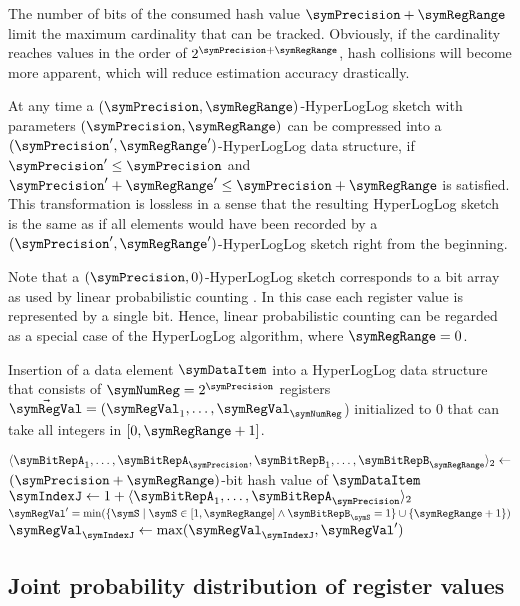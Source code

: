 \documentclass[a4paper]{scrartcl}
\begin{document}
The number of bits of the consumed hash value $\symPrecision+\symRegRange$ limit the maximum cardinality that can be tracked. Obviously, if the cardinality reaches values in the order of $2^{\symPrecision+\symRegRange}$, hash collisions will become more apparent, which will reduce estimation accuracy drastically.

At any time a $(\symPrecision, \symRegRange)$-HyperLogLog sketch with parameters $(\symPrecision, \symRegRange)$ can be compressed into a $(\symPrecision', \symRegRange')$-HyperLogLog data structure, if $\symPrecision'\leq\symPrecision$ and $\symPrecision'+\symRegRange' \leq\symPrecision + \symRegRange$ is satisfied. This transformation is lossless in a sense that the resulting HyperLogLog sketch is the same as if all elements would have been recorded by a $(\symPrecision', \symRegRange')$-HyperLogLog sketch right from the beginning.

Note that a $(\symPrecision, 0)$-HyperLogLog sketch corresponds to a bit array as used by linear probabilistic counting \cite{Whang1990}. In this case each register value is represented by a single bit. Hence, linear probabilistic counting can be regarded as a special case of the HyperLogLog algorithm, where $\symRegRange = 0$.

\begin{algorithm}
\caption{Insertion of a data element $\symDataItem$ into a HyperLogLog data structure that consists of $\symNumReg=2^\symPrecision$ registers $\vec{\symRegVal} = (\symRegVal_1,\ldots,\symRegVal_\symNumReg$) initialized to 0 that can take all integers in $[0, \symRegRange+1]$.}
\label{alg:insert}
\begin{algorithmic}
\State $\langle \symBitRepA_1, \ldots, \symBitRepA_\symPrecision,\symBitRepB_1,\ldots,\symBitRepB_\symRegRange\rangle_2 \gets$ $(\symPrecision + \symRegRange)$-bit hash value of $\symDataItem$
\State $\symIndexJ \gets 1+ \langle \symBitRepA_1, \ldots, \symBitRepA_\symPrecision\rangle_2$
\State $\symRegVal' = \min(\{\symS\mid \symS \in [1, \symRegRange]  \wedge  \symBitRepB_\symS = 1\}\cup {\{\symRegRange+1\}} )$
\State $\symRegVal_\symIndexJ \gets\max(\symRegVal_\symIndexJ, \symRegVal')$
\EndProcedure
\end{algorithmic}
\end{algorithm}

\subsection{Joint probability distribution of register values}
\end{document}
